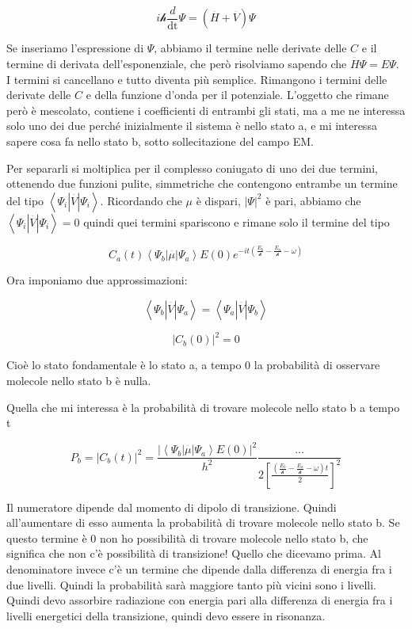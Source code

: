 \[i\mathcal{h}\frac{d}{\text{dt}}\Psi = \left( \overset{\overline{}}{H} + \overset{\overline{}}{V} \right)\Psi\]

Se inseriamo l'espressione di \(\Psi\), abbiamo il termine nelle
derivate delle \(C\) e il termine di derivata dell'esponenziale, che
però risolviamo sapendo che \(\overset{\overline{}}{H}\Psi = E\Psi\). I
termini si cancellano e tutto diventa più semplice. Rimangono i termini
delle derivate delle \(C\) e della funzione d'onda per il potenziale.
L'oggetto che rimane però è mescolato, contiene i coefficienti di
entrambi gli stati, ma a me ne interessa solo uno dei due perché
inizialmente il sistema è nello stato a, e mi interessa sapere cosa fa
nello stato b, sotto sollecitazione del campo EM.

Per separarli si moltiplica per il complesso coniugato di uno dei due
termini, ottenendo due funzioni pulite, simmetriche che contengono
entrambe un termine del tipo
\(\left\langle \Psi_{i}\left| \overset{\overline{}}{V} \right|\Psi_{i} \right\rangle\).
Ricordando che \(\mu\) è dispari, \(\left| \Psi \right|^{2}\) è pari,
abbiamo che
\(\left\langle \Psi_{i}\left| \overset{\overline{}}{V} \right|\Psi_{i} \right\rangle = 0\)
quindi quei termini spariscono e rimane solo il termine del tipo

\[C_{a}\left( t \right)\left\langle \Psi_{b}\left| \overset{\overline{}}{\mu} \right|\Psi_{a} \right\rangle E\left( 0 \right)e^{- it\left( \frac{E_{b}}{\mathcal{h}} - \frac{E_{a}}{\mathcal{h}} - \omega \right)}\]

Ora imponiamo due approssimazioni:

\[\left\langle \Psi_{b}\left| \overset{\overline{}}{V} \right|\Psi_{a} \right\rangle = \left\langle \Psi_{a}\left| \overset{\overline{}}{V} \right|\Psi_{b} \right\rangle\]

\[\left| C_{b}\left( 0 \right) \right|^{2} = 0\]

Cioè lo stato fondamentale è lo stato a, a tempo 0 la probabilità di
osservare molecole nello stato b è nulla.

Quella che mi interessa è la probabilità di trovare molecole nello stato
b a tempo t

\[P_{b} = \left| C_{b}\left( t \right) \right|^{2} = \frac{\left| \left\langle \Psi_{b}\left| \overset{\overline{}}{\mu} \right|\Psi_{a} \right\rangle E(0) \right|^{2}}{h^{2}}\frac{\ldots}{2\left\lbrack \frac{\left( \frac{E_{b}}{\mathcal{h}} - \frac{E_{a}}{\mathcal{h}} - \omega \right)t}{2} \right\rbrack^{2}}\]

Il numeratore dipende dal momento di dipolo di transizione. Quindi
all'aumentare di esso aumenta la probabilità di trovare molecole nello
stato b. Se questo termine è 0 non ho possibilità di trovare molecole
nello stato b, che significa che non c'è possibilità di transizione!
Quello che dicevamo prima. Al denominatore invece c'è un termine che
dipende dalla differenza di energia fra i due livelli. Quindi la
probabilità sarà maggiore tanto più vicini sono i livelli. Quindi devo
assorbire radiazione con energia pari alla differenza di energia fra i
livelli energetici della transizione, quindi devo essere in risonanza.

